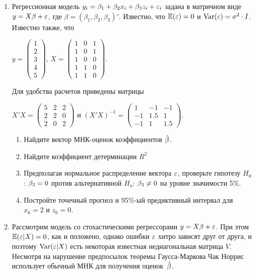 \documentclass[12pt, a4paper]{article}
\begin{document}
\begin{enumerate}
\item Регрессионная модель $y_i=\beta_1 + \beta_2 x_i + \beta_3 z_i + \varepsilon_i$  задана в матричном виде  $y=X\beta+\varepsilon$, где $\beta=(\beta_1,\beta_2,\beta_3)'$.
Известно, что $\mathbb{E}(\varepsilon)=0$  и  $\operatorname{Var}(\varepsilon)=\sigma^2\cdot I$.
Известно также, что

$y=\left(
\begin{array}{c}
1\\
2\\
3\\
4\\
5
\end{array}\right)$,
$X=\left(\begin{array}{ccc}
1 & 0 & 1 \\
1 & 0 & 1 \\
1 & 0 & 0 \\
1 & 1 & 0 \\
1 & 1 & 0
\end{array}\right)$.


Для удобства расчетов приведены матрицы


$X'X=\left(
\begin{array}{ccc}
5 & 2 & 2\\
2 & 2 & 0\\
2 & 0 & 2
\end{array}\right)$ и $(X'X)^{-1}=\left(
\begin{array}{ccc}
1 & -1 & -1 \\
-1 & 1.5 & 1 \\
-1 & 1 & 1.5
\end{array}\right)$.

\begin{enumerate}
\item Найдите вектор МНК-оценок коэффициентов $\hat{\beta}$.
\item Найдите коэффициент детерминации $R^2$
\item Предполагая нормальное распределение вектора $\varepsilon$, проверьте гипотезу $H_0$: $\beta_3=0$ против альтернативной $H_a$: $\beta_3\neq 0$ на уровне значимости 5\%.
\item Постройте точечный прогноз и 95\%-ый предиктивный интервал для $x_6=2$ и $z_6=0$.
\end{enumerate}


\item Рассмотрим модель со стохастическими регрессорами $y=X\beta + \varepsilon$. При этом $\mathbb{E}(\varepsilon|X)=0$, как и положено, однако ошибки $\varepsilon$ хитро зависят друг от друга, и поэтому $\operatorname{Var}(\varepsilon|X)$ есть некоторая известная недиагональная матрица $V$. Несмотря на нарушение предпосылок теоремы Гаусса-Маркова Чак Норрис использует обычный МНК для получения оценок~$\hat{\beta}$.


\end{enumerate}
\end{document}
